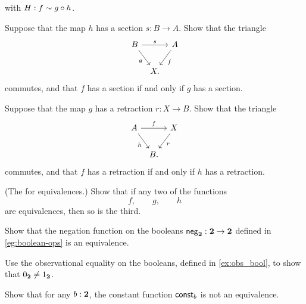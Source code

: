 \begin{exercises}
  with $H:f\sim g\circ h$.
  \begin{subexenum}
  \item Suppose that the map $h$ has a section $s:B \to A$. Show that the triangle
    \begin{equation*}
      \begin{tikzcd}[column sep=tiny]
        B \arrow[rr,"s"] \arrow[dr,swap,"g"] & & A \arrow[dl,"f"] \\
        & X.
      \end{tikzcd}
    \end{equation*}
    commutes, and that $f$ has a section if and only if $g$ has a section.
  \item Suppose that the map $g$ has a retraction $r:X\to B$. Show that the triangle
    \begin{equation*}
      \begin{tikzcd}[column sep=tiny]
        A \arrow[rr,"f"] \arrow[dr,swap,"h"] & & X \arrow[dl,"r"] \\
        & B.
      \end{tikzcd}
    \end{equation*}
    commutes, and that $f$ has a retraction if and only if $h$ has a retraction.
  \item (The  for equivalences.) Show that if any two of the functions
    \begin{equation*}
      f,\qquad g,\qquad h
    \end{equation*}
    are equivalences, then so is the third.
  \end{subexenum}
  \exercise \label{ex:neg_equiv} 
  \begin{subexenum}
  \item Show that the negation function on the booleans $\mathsf{neg}_{\mathbf{2}}:\mathbf{2}\to\mathbf{2}$ defined in \cref{eg:boolean-ops} is an equivalence.
  \item Use the observational equality on the booleans, defined in \cref{ex:obs_bool}, to show that ${0_{\mathbf{2}}}\neq{1_{\ensuremath{\mathbf{2}}}}$.
  \item Show that for any $b:\mathbf{2}$, the constant function $\mathsf{const}_b$ is not an equivalence.

\end{subexenum}
\end{exercises}
